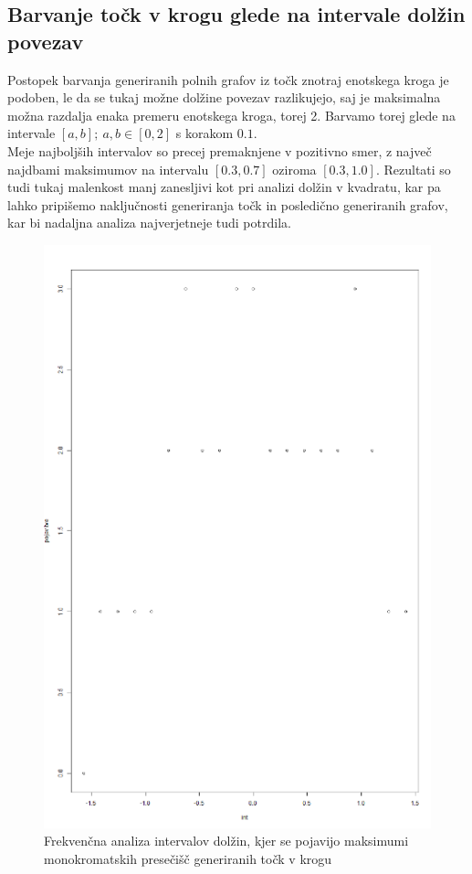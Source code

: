 \documentclass[12pt, a4paper]{article}
\begin{document}
	\subsection{Barvanje točk v krogu glede na intervale dolžin povezav}
	Postopek barvanja generiranih polnih grafov iz točk znotraj enotskega kroga je podoben, le da se tukaj možne dolžine povezav razlikujejo, saj je maksimalna možna razdalja enaka premeru enotskega kroga, torej 2. Barvamo torej glede na intervale $\left[{a,b}\right]; \ a,b \in \left[{0,2}\right]$ s korakom $0.1$. \\
	Meje najboljših  intervalov so precej premaknjene v pozitivno smer, z največ najdbami maksimumov na intervalu $\left[{0.3, 0.7}\right]$ oziroma $\left[{0.3, 1.0}\right]$. Rezultati so tudi tukaj malenkost manj zanesljivi kot pri analizi dolžin v kvadratu, kar pa lahko pripišemo naključnosti generiranja točk in posledično generiranih grafov, kar bi nadaljna analiza najverjetneje tudi potrdila.
	\begin{figure}[h!]
		\caption{Frekvenčna analiza intervalov dolžin, kjer se pojavijo maksimumi monokromatskih presečišč generiranih točk v krogu}
		\includegraphics[scale=0.6]{frekvencni_krog}
		\centering
	\end{figure}
\end{document}
